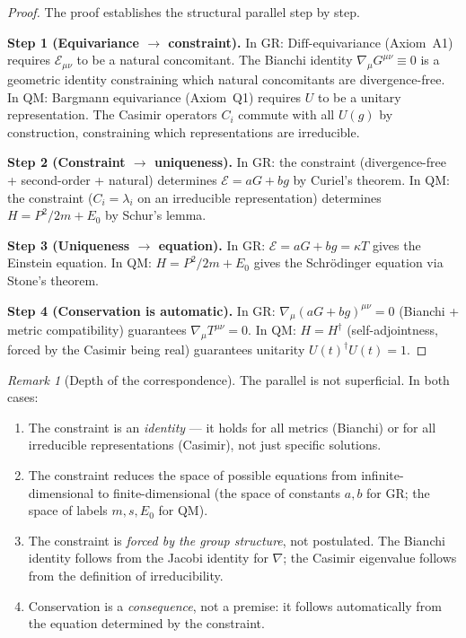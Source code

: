 \documentclass[12pt]{article}
\theoremstyle{plain}
\theoremstyle{definition}
\theoremstyle{remark}
\newtheorem{remark}[theorem]{Remark}
\newcommand{\Diff}{\mathrm{Diff}}
\begin{document}
\begin{proof}
The proof establishes the structural parallel step by step.

\textbf{Step 1 (Equivariance $\to$ constraint).} In GR: $\Diff$-equivariance (Axiom~A1) requires $\mathcal{E}_{\mu\nu}$ to be a natural concomitant. The Bianchi identity $\nabla_\mu G^{\mu\nu} \equiv 0$ is a geometric identity constraining which natural concomitants are divergence-free. In QM: Bargmann equivariance (Axiom~Q1) requires $U$ to be a unitary representation. The Casimir operators $C_i$ commute with all $U(g)$ by construction, constraining which representations are irreducible.

\textbf{Step 2 (Constraint $\to$ uniqueness).} In GR: the constraint (divergence-free + second-order + natural) determines $\mathcal{E} = aG + bg$ by Curiel's theorem. In QM: the constraint ($C_i = \lambda_i$ on an irreducible representation) determines $H = P^2/2m + E_0$ by Schur's lemma.

\textbf{Step 3 (Uniqueness $\to$ equation).} In GR: $\mathcal{E} = aG + bg = \kappa T$ gives the Einstein equation. In QM: $H = P^2/2m + E_0$ gives the Schr\"odinger equation via Stone's theorem.

\textbf{Step 4 (Conservation is automatic).} In GR: $\nabla_\mu(aG + bg)^{\mu\nu} = 0$ (Bianchi + metric compatibility) guarantees $\nabla_\mu T^{\mu\nu} = 0$. In QM: $H = H^\dagger$ (self-adjointness, forced by the Casimir being real) guarantees unitarity $U(t)^\dagger U(t) = 1$.
\end{proof}

\begin{remark}[Depth of the correspondence]
The parallel is not superficial. In both cases:
\begin{enumerate}[label=(\roman*)]
    \item The constraint is an \emph{identity} --- it holds for all metrics (Bianchi) or for all irreducible representations (Casimir), not just specific solutions.
    \item The constraint reduces the space of possible equations from infinite-dimensional to finite-dimensional (the space of constants $a, b$ for GR; the space of labels $m, s, E_0$ for QM).
    \item The constraint is \emph{forced by the group structure}, not postulated. The Bianchi identity follows from the Jacobi identity for $\nabla$; the Casimir eigenvalue follows from the definition of irreducibility.
    \item Conservation is a \emph{consequence}, not a premise: it follows automatically from the equation determined by the constraint.
\end{enumerate}
\end{remark}
\end{document}
